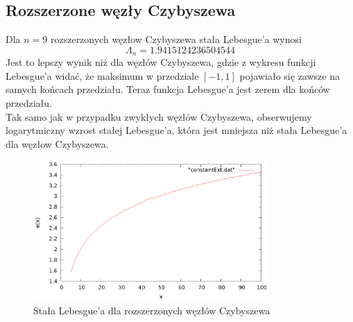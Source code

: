 \documentclass{article}
\begin{document}
\subsection{Rozszerzone węzły Czybyszewa}
Dla $n = 9$ rozszerzonych węzłow Czybyszewa stała Lebesgue'a wynosi
\begin{equation*}
\Lambda_n = 1.9415124236504544
\end{equation*}
Jest to lepszy wynik niż dla węzłów Czybyszewa, gdzie z wykresu funkcji Lebesgue'a widać, że maksimum w przedziale $[-1, 1]$ pojawiało się zawsze na samych końcach przedziału. Teraz funkcja Lebesgue'a jest zerem dla końców przedziału.\\
Tak samo jak w przypadku zwykłych węzłów Czybyszewa, obserwujemy logarytmiczny wzrost stałej Lebesgue'a, która jest mniejsza niż stała Lebesgue'a dla węzłow Czybyszewa.
\begin{figure}
    \centering
    \includegraphics[width=0.8\textwidth]{wykresy/constantExt.eps}
    \caption{Stała Lebesgue'a dla rozszerzonych węzłów Czybyszewa}
\end{figure}
\end{document}
